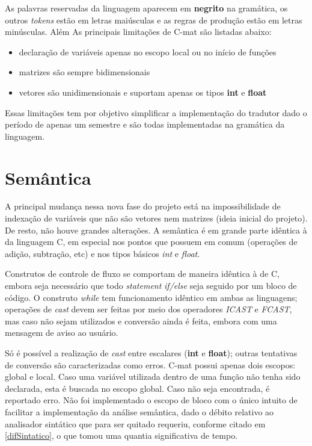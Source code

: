 \documentclass[
	article,			%
	11pt,				%
	oneside,			%
	a4paper,			%
	english,			%
	brazil,				%
	sumario=tradicional
	]{abntex2}
\renewcommand{\it}[1]{\textit{#1}}
\renewcommand{\bf}[1]{\textbf{#1}}
\begin{document}
As palavras reservadas da linguagem aparecem em \bf{negrito} na gramática, os outros \it{tokens} estão em letras maiúsculas e as regras de produção estão em letras minúsculas. Além As principais limitações de C-mat são listadas abaixo:
\begin{itemize}
	\item declaração de variáveis apenas no escopo local ou no início de funções
	\item matrizes são sempre bidimensionais
	\item vetores são unidimensionais e suportam apenas os tipos \bf{int} e \bf{float}
\end{itemize}
Essas limitações tem por objetivo simplificar a implementação do tradutor dado o período de apenas um semestre e são todas implementadas na gramática da linguagem.






\section{Semântica}
A principal mudança nessa nova fase do projeto está na impossibilidade de indexação de variáveis que não são vetores nem matrizes (ideia inicial do projeto). De resto, não houve grandes alterações. A semântica é em grande parte idêntica à da linguagem C, em especial nos pontos que possuem em comum (operações de adição, subtração, etc) e nos tipos básicos \it{int} e \it{float}. 

Construtos de controle de fluxo se comportam de maneira idêntica à de C, embora seja necessário que todo \it{statement} \it{if/else} seja seguido por um bloco de código. O construto \it{while} tem funcionamento idêntico em ambas as linguagens; operações de \it{cast} devem ser feitas por meio dos operadores \it{ICAST} e \it{FCAST}, mas caso não sejam utilizados e conversão ainda é feita, embora com uma mensagem de aviso ao usuário.

Só é possível a realização de \it{cast} entre escalares (\bf{int} e \bf{float}); outras tentativas de conversão são caracterizadas como erros. C-mat possui apenas dois escopos: global e local. Caso uma variável utilizada dentro de uma função não tenha sido declarada, esta é buscada no escopo global. Caso não seja encontrada, é reportado erro. Não foi implementado o escopo de bloco com o
único intuito de facilitar a implementação da análise semântica, dado o débito relativo ao analisador sintático que para ser quitado
requeriu, conforme citado em \ref{difSintatico}, o que tomou uma quantia significativa de tempo.
\end{document}
